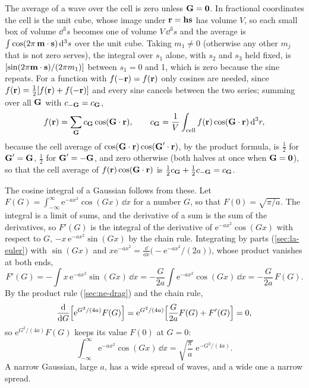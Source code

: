 \begin{toolbox}
The average of a wave over the cell is zero unless $\bm{\mathrm{G}} = \bm{\mathrm{0}}$. In
fractional coordinates the cell is the unit cube, whose image under $\bm{\mathrm{r}}
= \bm{\mathrm{h}}\bm{\mathrm{s}}$ has volume $V$, so each small box of volume $\dd^3s$
becomes one of volume $V\,\dd^3s$ and the average is $\int\cos(2\pi\,
\bm{\mathrm{m}}\cdot\bm{\mathrm{s}})\,\mathrm{d}^3s$ over the unit cube. Taking $m_1 \neq 0$
(otherwise any other $m_j$ that is not zero serves), the integral over
$s_1$ alone, with $s_2$ and $s_3$ held fixed, is $[\sin(2\pi\bm{\mathrm{m}}\cdot
\bm{\mathrm{s}})/(2\pi m_1)]$ between $s_1 = 0$ and 1, which is zero because the
sine repeats. For a function with $f(-\bm{\mathrm{r}}) = f(\bm{\mathrm{r}})$ only cosines
are needed, since $f(\bm{\mathrm{r}}) = \frac12[f(\bm{\mathrm{r}}) + f(-\bm{\mathrm{r}})]$ and every
sine cancels between the two series; summing over all $\bm{\mathrm{G}}$ with
$c_{-\bm{\mathrm{G}}} = c_{\bm{\mathrm{G}}}$,
\begin{equation*}
   f(\bm{\mathrm{r}}) = \sum_{\bm{\mathrm{G}}}c_{\bm{\mathrm{G}}}\cos(\bm{\mathrm{G}}\cdot\bm{\mathrm{r}}) ,
   \qquad
   c_{\bm{\mathrm{G}}} = \frac1V\int_{\text{cell}}f(\bm{\mathrm{r}})\cos(\bm{\mathrm{G}}\cdot\bm{\mathrm{r}})
   \,\mathrm{d}^3r ,
\end{equation*}
because the cell average of $\cos(\bm{\mathrm{G}}\cdot\bm{\mathrm{r}})\cos(\bm{\mathrm{G}}'\cdot
\bm{\mathrm{r}})$, by the product formula, is $\frac12$ for $\bm{\mathrm{G}}' = \bm{\mathrm{G}}$,
$\frac12$ for $\bm{\mathrm{G}}' = -\bm{\mathrm{G}}$, and zero otherwise (both halves at once
when $\bm{\mathrm{G}} = \bm{\mathrm{0}}$), so that the cell average of $f(\bm{\mathrm{r}})\cos(\bm{\mathrm{G}}
\cdot\bm{\mathrm{r}})$ is $\frac12c_{\bm{\mathrm{G}}} + \frac12c_{-\bm{\mathrm{G}}} = c_{\bm{\mathrm{G}}}$.
\end{toolbox}

The cosine integral of a Gaussian follows from these. Let $F(G) =
\int_{-\infty}^{\infty}\mathrm{e}^{-ax^2}\cos(Gx)\,\dd x$ for a number $G$,
so that $F(0) = \sqrt{\pi/a}$. The integral is a limit of sums, and the
derivative of a sum is the sum of the derivatives, so $F'(G)$ is the
integral of the derivative of $\mathrm{e}^{-ax^2}\cos(Gx)$ with respect to
$G$, $-x\,\mathrm{e}^{-ax^2}\sin(Gx)$ by the chain rule. Integrating by
parts (\cref{sec:la-euler}) with $\sin(Gx)$ and $x\mathrm{e}^{-ax^2} =
\frac{\dd}{\dd x}\bigl(-\mathrm{e}^{-ax^2}/(2a)\bigr)$, whose product
vanishes at both ends,
\begin{equation*}
   F'(G) = -\int x\,\mathrm{e}^{-ax^2}\sin(Gx)\,\dd x
   = -\frac{G}{2a}\int\mathrm{e}^{-ax^2}\cos(Gx)\,\dd x
   = -\frac{G}{2a}\,F(G) .
\end{equation*}
By the product rule (\cref{sec:ne-drag}) and the chain rule,
\begin{equation*}
   \frac{\mathrm{d}}{\mathrm{d} G}\Bigl[\mathrm{e}^{G^2/(4a)}F(G)\Bigr]
   = \mathrm{e}^{G^2/(4a)}\Bigl[\frac{G}{2a}F(G) + F'(G)\Bigr] = 0 ,
\end{equation*}
so $\mathrm{e}^{G^2/(4a)}F(G)$ keeps its value $F(0)$ at $G = 0$:
\begin{equation}
   \int_{-\infty}^{\infty}\mathrm{e}^{-ax^2}\cos(Gx)\,\dd x
   = \sqrt{\frac{\pi}{a}}\;\mathrm{e}^{-G^2/(4a)} .
   \label{eq:md-gauss-cos}
\end{equation}
A narrow Gaussian, large $a$, has a wide spread of waves, and a wide one a
narrow spread.

